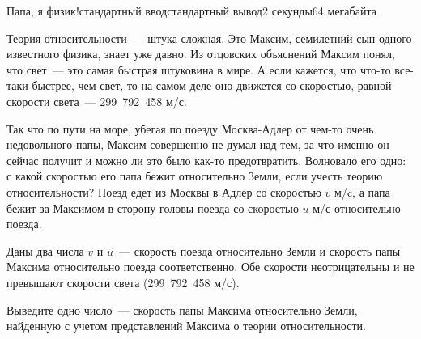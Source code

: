 \begin{problem}{Папа, я физик!}{стандартный ввод}{стандартный вывод}{2 секунды}{64 мегабайта}

Теория относительности~--- штука сложная. Это Максим, семилетний сын одного известного физика, знает уже давно. Из отцовских объяснений Максим понял, что свет~--- это самая быстрая штуковина в мире. А если кажется, что что-то все-таки быстрее, чем свет, то на самом деле оно движется со скоростью, равной скорости света~--- 299~792~458 м/с. 

Так что по пути на море, убегая по поезду Москва-Адлер от чем-то очень недовольного папы, Максим совершенно не думал над тем, за что именно он сейчас получит и можно ли это было как-то предотвратить. Волновало его одно: с какой скоростью его папа бежит относительно Земли, если учесть теорию относительности? Поезд едет из Москвы в Адлер со скоростью $v$ м/c, а папа бежит за Максимом в сторону головы поезда со скоростью $u$ м/с относительно поезда. 

\InputFile
Даны два числа $v$ и $u$~--- скорость поезда относительно Земли и скорость папы Максима относительно поезда соответственно. Обе скорости неотрицательны и не превышают скорости света (299~792~458 м/с).

\OutputFile
Выведите одно число~--- скорость папы Максима относительно Земли, найденную с учетом представлений Максима о теории относительности.

\Examples

\begin{example}
%
%
\end{example}

\end{problem}
